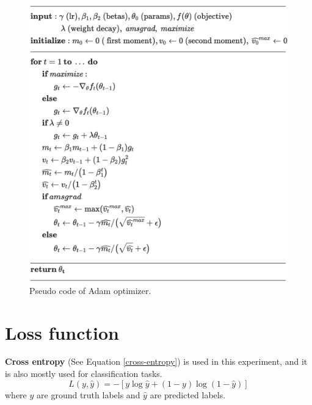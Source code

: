     \begin{figure}[H]
		\centering
		\includegraphics[scale=0.5]{img/adam.png}
		\caption{Pseudo code of Adam optimizer.}
		\label{adam}
	\end{figure}

\section{Loss function}
\indent
    \textbf{Cross entropy} (See Equation \ref{cross-entropy}) is used in this experiment, and it is also mostly used for classification tasks.
    \begin{equation}
        L(y, \hat{y}) = -[y\log\hat{y} + (1 - y)\log(1 - \hat{y})]
    \label{cross-entropy}
    \end{equation}
    where $y$ are ground truth labels and $\hat{y}$ are predicted labels.

